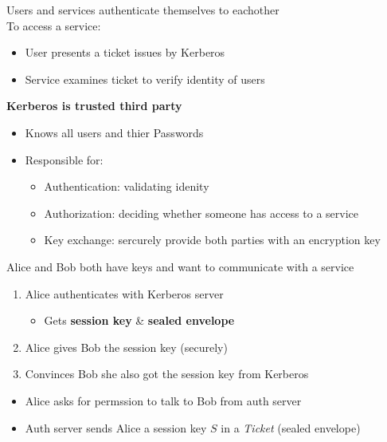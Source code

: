 \documentclass{easyclass}
\begin{document}
\begin{theo}[Kerberos]{}
    Users and services authenticate themselves to eachother\\
    To access a service:
    \begin{itemize}
        \item User presents a ticket issues by Kerberos
        \item Service examines ticket to verify identity of users
    \end{itemize}
    \textbf{Kerberos is trusted third party}
    \begin{itemize}
        \item Knows all users and thier Passwords
        \item Responsible for:
        \begin{itemize}
            \item Authentication: validating idenity
            \item Authorization: deciding whether someone has access to a service
            \item Key exchange: sercurely provide both parties with an encryption key
        \end{itemize}
    \end{itemize}
\end{theo}
\newpage
\begin{prf}[Communication]{}
    Alice and Bob both have keys and want to communicate with a service
    \begin{enumerate}
        \item Alice authenticates with Kerberos server
        \begin{itemize}
            \item Gets \textbf{session key} \& \textbf{sealed envelope}
        \end{itemize}
        \item Alice gives Bob the session key (securely)
        \item Convinces Bob she also got the session key from Kerberos
    \end{enumerate}
\end{prf}
\begin{lem}[Authenticate]{}
    \begin{itemize}
        \item Alice asks for permssion to talk to Bob from auth server
        \item Auth server sends Alice a session key $S$ in a \emph{Ticket} (sealed envelope)
    \end{itemize}
\end{lem}
\end{document}
